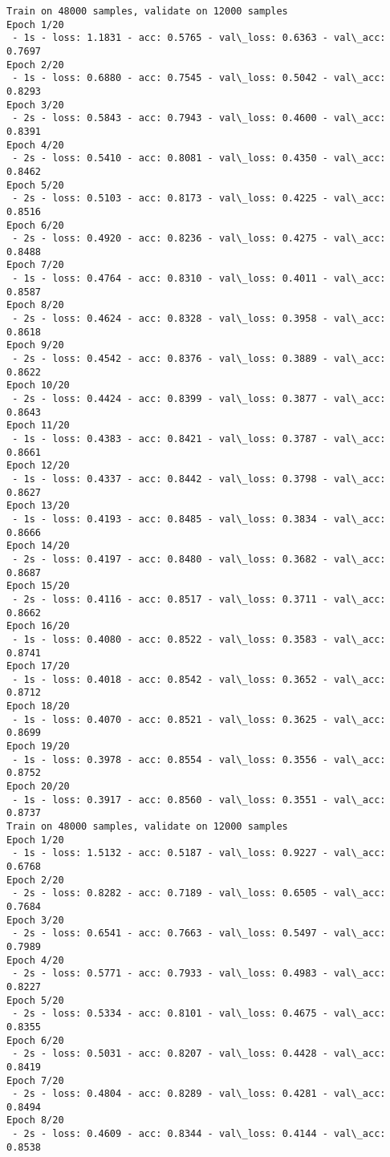 \documentclass[11pt]{article}
\begin{document}
    \begin{Verbatim}[commandchars=\\\{\}]
Train on 48000 samples, validate on 12000 samples
Epoch 1/20
 - 1s - loss: 1.1831 - acc: 0.5765 - val\_loss: 0.6363 - val\_acc: 0.7697
Epoch 2/20
 - 1s - loss: 0.6880 - acc: 0.7545 - val\_loss: 0.5042 - val\_acc: 0.8293
Epoch 3/20
 - 2s - loss: 0.5843 - acc: 0.7943 - val\_loss: 0.4600 - val\_acc: 0.8391
Epoch 4/20
 - 2s - loss: 0.5410 - acc: 0.8081 - val\_loss: 0.4350 - val\_acc: 0.8462
Epoch 5/20
 - 2s - loss: 0.5103 - acc: 0.8173 - val\_loss: 0.4225 - val\_acc: 0.8516
Epoch 6/20
 - 2s - loss: 0.4920 - acc: 0.8236 - val\_loss: 0.4275 - val\_acc: 0.8488
Epoch 7/20
 - 1s - loss: 0.4764 - acc: 0.8310 - val\_loss: 0.4011 - val\_acc: 0.8587
Epoch 8/20
 - 2s - loss: 0.4624 - acc: 0.8328 - val\_loss: 0.3958 - val\_acc: 0.8618
Epoch 9/20
 - 2s - loss: 0.4542 - acc: 0.8376 - val\_loss: 0.3889 - val\_acc: 0.8622
Epoch 10/20
 - 2s - loss: 0.4424 - acc: 0.8399 - val\_loss: 0.3877 - val\_acc: 0.8643
Epoch 11/20
 - 1s - loss: 0.4383 - acc: 0.8421 - val\_loss: 0.3787 - val\_acc: 0.8661
Epoch 12/20
 - 1s - loss: 0.4337 - acc: 0.8442 - val\_loss: 0.3798 - val\_acc: 0.8627
Epoch 13/20
 - 1s - loss: 0.4193 - acc: 0.8485 - val\_loss: 0.3834 - val\_acc: 0.8666
Epoch 14/20
 - 2s - loss: 0.4197 - acc: 0.8480 - val\_loss: 0.3682 - val\_acc: 0.8687
Epoch 15/20
 - 2s - loss: 0.4116 - acc: 0.8517 - val\_loss: 0.3711 - val\_acc: 0.8662
Epoch 16/20
 - 1s - loss: 0.4080 - acc: 0.8522 - val\_loss: 0.3583 - val\_acc: 0.8741
Epoch 17/20
 - 1s - loss: 0.4018 - acc: 0.8542 - val\_loss: 0.3652 - val\_acc: 0.8712
Epoch 18/20
 - 1s - loss: 0.4070 - acc: 0.8521 - val\_loss: 0.3625 - val\_acc: 0.8699
Epoch 19/20
 - 1s - loss: 0.3978 - acc: 0.8554 - val\_loss: 0.3556 - val\_acc: 0.8752
Epoch 20/20
 - 1s - loss: 0.3917 - acc: 0.8560 - val\_loss: 0.3551 - val\_acc: 0.8737
Train on 48000 samples, validate on 12000 samples
Epoch 1/20
 - 1s - loss: 1.5132 - acc: 0.5187 - val\_loss: 0.9227 - val\_acc: 0.6768
Epoch 2/20
 - 2s - loss: 0.8282 - acc: 0.7189 - val\_loss: 0.6505 - val\_acc: 0.7684
Epoch 3/20
 - 2s - loss: 0.6541 - acc: 0.7663 - val\_loss: 0.5497 - val\_acc: 0.7989
Epoch 4/20
 - 2s - loss: 0.5771 - acc: 0.7933 - val\_loss: 0.4983 - val\_acc: 0.8227
Epoch 5/20
 - 2s - loss: 0.5334 - acc: 0.8101 - val\_loss: 0.4675 - val\_acc: 0.8355
Epoch 6/20
 - 2s - loss: 0.5031 - acc: 0.8207 - val\_loss: 0.4428 - val\_acc: 0.8419
Epoch 7/20
 - 2s - loss: 0.4804 - acc: 0.8289 - val\_loss: 0.4281 - val\_acc: 0.8494
Epoch 8/20
 - 2s - loss: 0.4609 - acc: 0.8344 - val\_loss: 0.4144 - val\_acc: 0.8538

\end{Verbatim}
\end{document}
